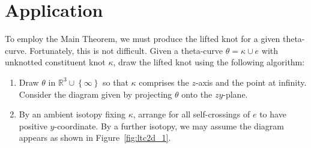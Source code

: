 \documentclass{amsart}
\numberwithin{equation}{section}
\theoremstyle{definition}
\def\R{\ensuremath{\mathbb{R}}}
\newcommand{\cpa}[1]{\left\{#1\right\}}
\begin{document}
\section{Application}
\label{sec:applications}
To employ the Main Theorem, we must produce the lifted knot for a given theta-curve.
Fortunately, this is not difficult.
Given a theta-curve $\theta=\kappa\cup e$ with unknotted constituent knot $\kappa$, draw the lifted knot using the following algorithm:
\begin{enumerate}
\item Draw $\theta$ in $\R^3\cup\cpa{\infty}$ so that $\kappa$ comprises the $z$-axis and the point at infinity.
Consider the diagram given by projecting $\theta$ onto the $zy$-plane.
\item By an ambient isotopy fixing $\kappa$, arrange for all self-crossings of $e$ to have positive $y$-coordinate.
By a further isotopy, we may assume the diagram appears as shown in Figure~\ref{fig:ltc2d_1}.
\begin{figure}[htbp!]
\centering
{}
\hspace{1cm}
\end{figure}
\end{enumerate}
\end{document}
